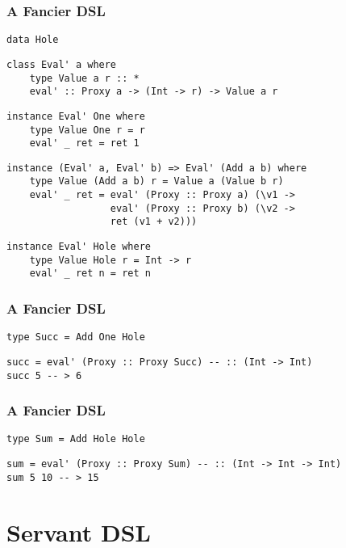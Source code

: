 \documentclass{beamer}
\begin{document}
\begin{frame}[fragile]
\frametitle{A Fancier DSL} \pause

\begin{verbatim}
data Hole
\end{verbatim}
\pause
\begin{verbatim}
class Eval' a where
    type Value a r :: *
    eval' :: Proxy a -> (Int -> r) -> Value a r
\end{verbatim}
\pause
\begin{verbatim}
instance Eval' One where
    type Value One r = r
    eval' _ ret = ret 1
\end{verbatim}
\pause
\begin{verbatim}
instance (Eval' a, Eval' b) => Eval' (Add a b) where
    type Value (Add a b) r = Value a (Value b r)
    eval' _ ret = eval' (Proxy :: Proxy a) (\v1 ->
                  eval' (Proxy :: Proxy b) (\v2 ->
                  ret (v1 + v2)))
\end{verbatim}
\pause
\begin{verbatim}
instance Eval' Hole where
    type Value Hole r = Int -> r
    eval' _ ret n = ret n
\end{verbatim}
\end{frame}

\begin{frame}[fragile]
\frametitle{A Fancier DSL}
\begin{verbatim}
type Succ = Add One Hole
\end{verbatim}\pause
\begin{verbatim}
succ = eval' (Proxy :: Proxy Succ) -- :: (Int -> Int)
succ 5 -- > 6
\end{verbatim}
\end{frame}

\begin{frame}[fragile]
\frametitle{A Fancier DSL}
\begin{verbatim}
type Sum = Add Hole Hole
\end{verbatim}\pause
\begin{verbatim}
sum = eval' (Proxy :: Proxy Sum) -- :: (Int -> Int -> Int)
sum 5 10 -- > 15
\end{verbatim}
\end{frame}

\section{Servant DSL}
\end{document}
